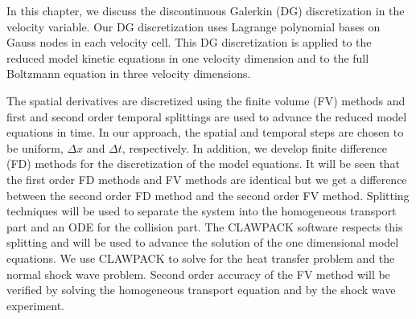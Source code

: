 In this chapter, we discuss the discontinuous Galerkin (DG) discretization in the velocity variable. Our DG discretization uses Lagrange polynomial bases on Gauss nodes in each velocity cell. This DG discretization is applied to the reduced model kinetic equations in one velocity dimension and to the full Boltzmann equation in three velocity dimensions.

The spatial derivatives are discretized using the finite volume (FV) methods and first and second order temporal splittings are used to advance the reduced model equations in time. In our approach, the spatial and temporal steps are chosen to be uniform, $\Delta x$ and $\Delta t$, respectively. In addition, we develop finite difference (FD) methods for the discretization of the model equations. It will be seen that the first order FD methods and FV methods are identical but we get a difference between the second order FD method and the second order FV method. Splitting techniques will be used to separate the system into the homogeneous transport part and an ODE for the collision part. The CLAWPACK software respects this splitting and will be used to advance the solution of the one dimensional model equations. We use CLAWPACK to solve for the heat transfer problem and the normal shock wave problem. Second order accuracy of the FV method will be verified by solving the homogeneous transport equation and by the shock wave experiment.
